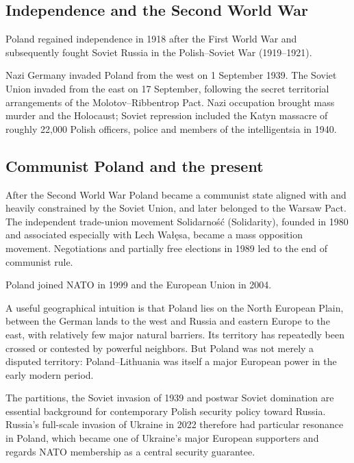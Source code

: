 \subsection{Independence and the Second World War}

Poland regained independence in 1918 after the First World War and subsequently fought Soviet Russia in the Polish--Soviet War (1919--1921).

Nazi Germany invaded Poland from the west on 1 September 1939. The Soviet Union invaded from the east on 17 September, following the secret territorial arrangements of the Molotov--Ribbentrop Pact. Nazi occupation brought mass murder and the Holocaust; Soviet repression included the Katyn massacre of roughly 22,000 Polish officers, police and members of the intelligentsia in 1940.

\subsection{Communist Poland and the present}

After the Second World War Poland became a communist state aligned with and heavily constrained by the Soviet Union, and later belonged to the Warsaw Pact. The independent trade-union movement Solidarność (Solidarity), founded in 1980 and associated especially with Lech Wałęsa, became a mass opposition movement. Negotiations and partially free elections in 1989 led to the end of communist rule.

Poland joined NATO in 1999 and the European Union in 2004.

A useful geographical intuition is that Poland lies on the North European Plain, between the German lands to the west and Russia and eastern Europe to the east, with relatively few major natural barriers. Its territory has repeatedly been crossed or contested by powerful neighbors. But Poland was not merely a disputed territory: Poland--Lithuania was itself a major European power in the early modern period.

The partitions, the Soviet invasion of 1939 and postwar Soviet domination are essential background for contemporary Polish security policy toward Russia. Russia's full-scale invasion of Ukraine in 2022 therefore had particular resonance in Poland, which became one of Ukraine's major European supporters and regards NATO membership as a central security guarantee.
